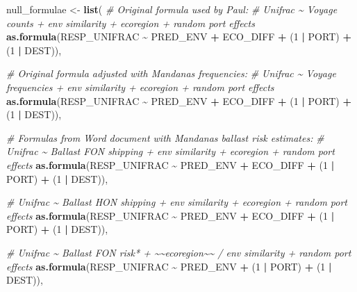 \documentclass[
]{article}
\newenvironment{Shaded}{\begin{snugshade}}{\end{snugshade}}
\newcommand{\CommentTok}[1]{\textcolor[rgb]{0.56,0.35,0.01}{\textit{#1}}}
\newcommand{\DecValTok}[1]{\textcolor[rgb]{0.00,0.00,0.81}{#1}}
\newcommand{\KeywordTok}[1]{\textcolor[rgb]{0.13,0.29,0.53}{\textbf{#1}}}
\newcommand{\NormalTok}[1]{#1}
\newcommand{\OperatorTok}[1]{\textcolor[rgb]{0.81,0.36,0.00}{\textbf{#1}}}
\newcommand{\StringTok}[1]{\textcolor[rgb]{0.31,0.60,0.02}{#1}}
\begin{document}
\begin{Shaded}
\begin{Highlighting}[]
\NormalTok{null\_formulae <{-}}\StringTok{ }\KeywordTok{list}\NormalTok{(}
  \CommentTok{\# Original formula used by Paul:}
  \CommentTok{\# Unifrac \textasciitilde{} Voyage counts  + env similarity + ecoregion + random port effects}
  \KeywordTok{as.formula}\NormalTok{(RESP\_UNIFRAC }\OperatorTok{\textasciitilde{}}\StringTok{ }\NormalTok{PRED\_ENV }\OperatorTok{+}\StringTok{ }\NormalTok{ECO\_DIFF }\OperatorTok{+}\StringTok{ }\NormalTok{(}\DecValTok{1} \OperatorTok{|}\StringTok{ }\NormalTok{PORT) }\OperatorTok{+}\StringTok{ }\NormalTok{(}\DecValTok{1} \OperatorTok{|}\StringTok{ }\NormalTok{DEST)),}

  \CommentTok{\# Original formula adjusted with Mandana\textquotesingle{}s frequencies:}
  \CommentTok{\# Unifrac \textasciitilde{} Voyage frequencies + env similarity + ecoregion + random port effects}
  \KeywordTok{as.formula}\NormalTok{(RESP\_UNIFRAC }\OperatorTok{\textasciitilde{}}\StringTok{ }\NormalTok{PRED\_ENV }\OperatorTok{+}\StringTok{ }\NormalTok{ECO\_DIFF }\OperatorTok{+}\StringTok{ }\NormalTok{(}\DecValTok{1} \OperatorTok{|}\StringTok{ }\NormalTok{PORT) }\OperatorTok{+}\StringTok{ }\NormalTok{(}\DecValTok{1} \OperatorTok{|}\StringTok{ }\NormalTok{DEST)),}

  \CommentTok{\# Formulas from Word document with Mandana\textquotesingle{}s ballast risk estimates:}
  \CommentTok{\# Unifrac \textasciitilde{} Ballast FON shipping + env similarity + ecoregion + random port effects}
  \KeywordTok{as.formula}\NormalTok{(RESP\_UNIFRAC }\OperatorTok{\textasciitilde{}}\StringTok{ }\NormalTok{PRED\_ENV }\OperatorTok{+}\StringTok{ }\NormalTok{ECO\_DIFF }\OperatorTok{+}\StringTok{ }\NormalTok{(}\DecValTok{1} \OperatorTok{|}\StringTok{ }\NormalTok{PORT) }\OperatorTok{+}\StringTok{ }\NormalTok{(}\DecValTok{1} \OperatorTok{|}\StringTok{ }\NormalTok{DEST)),}

  \CommentTok{\# Unifrac \textasciitilde{} Ballast HON shipping + env similarity + ecoregion + random port effects}
  \KeywordTok{as.formula}\NormalTok{(RESP\_UNIFRAC }\OperatorTok{\textasciitilde{}}\StringTok{ }\NormalTok{PRED\_ENV }\OperatorTok{+}\StringTok{ }\NormalTok{ECO\_DIFF }\OperatorTok{+}\StringTok{ }\NormalTok{(}\DecValTok{1} \OperatorTok{|}\StringTok{ }\NormalTok{PORT) }\OperatorTok{+}\StringTok{ }\NormalTok{(}\DecValTok{1} \OperatorTok{|}\StringTok{ }\NormalTok{DEST)),}

  \CommentTok{\# Unifrac \textasciitilde{} Ballast FON risk* + \textasciitilde{}\textasciitilde{}ecoregion\textasciitilde{}\textasciitilde{} / env similarity + random port effects}
  \KeywordTok{as.formula}\NormalTok{(RESP\_UNIFRAC }\OperatorTok{\textasciitilde{}}\StringTok{ }\NormalTok{PRED\_ENV }\OperatorTok{+}\StringTok{ }\NormalTok{(}\DecValTok{1} \OperatorTok{|}\StringTok{ }\NormalTok{PORT) }\OperatorTok{+}\StringTok{ }\NormalTok{(}\DecValTok{1} \OperatorTok{|}\StringTok{ }\NormalTok{DEST)),}


\end{Highlighting}
\end{Shaded}
\end{document}
